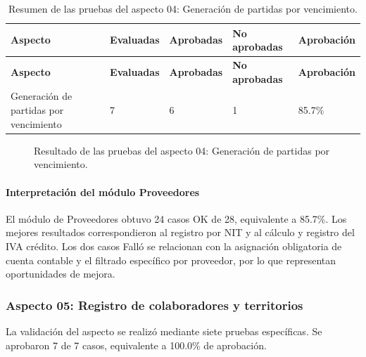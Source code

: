 \endgroup
\begingroup\fontsize{8}{9}\selectfont\setlength{\tabcolsep}{4pt}
\begin{xltabular}{\linewidth}{@{}p{4.0cm}p{2.0cm}p{2.0cm}p{2.2cm}p{2.2cm}@{}}

\caption{Resumen de las pruebas del aspecto 04: Generación de partidas por vencimiento.}\label{tab:cap4_resumen_aspecto_04}\\
\toprule
\textbf{Aspecto} & \textbf{Evaluadas} & \textbf{Aprobadas} & \textbf{No aprobadas} & \textbf{Aprobación}\\
\midrule
\endfirsthead
\toprule
\textbf{Aspecto} & \textbf{Evaluadas} & \textbf{Aprobadas} & \textbf{No aprobadas} & \textbf{Aprobación}\\
\midrule
\endhead
\endfoot
\bottomrule
\endlastfoot

Generación de partidas por vencimiento & 7 & 6 & 1 & 85.7\%\\
\bottomrule
\end{xltabular}
\endgroup


\begin{figure}[H]
\centering
\caption{Resultado de las pruebas del aspecto 04: Generación de partidas por vencimiento.}\label{fig:cap4_aspecto_prov_04}
\end{figure}

\paragraph{Interpretación del módulo Proveedores}
El módulo de Proveedores obtuvo 24 casos OK de 28, equivalente a 85.7\%. Los mejores resultados correspondieron al registro por NIT y al cálculo y registro del IVA crédito. Los dos casos Falló se relacionan con la asignación obligatoria de cuenta contable y el filtrado específico por proveedor, por lo que representan oportunidades de mejora.

\subsubsection{Aspecto 05: Registro de colaboradores y territorios}
La validación del aspecto se realizó mediante siete pruebas específicas. Se aprobaron 7 de 7 casos, equivalente a 100.0\% de aprobación.


